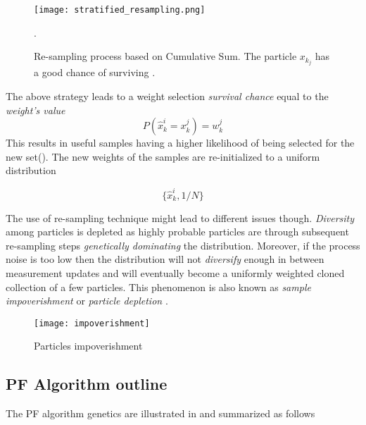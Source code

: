 \begin{figure}[H]
	\centering
	\texttt{[image: stratified\_resampling.png]}
	\caption{Re-sampling process based on Cumulative Sum. The particle $x_{k_j}$ has a good chance of surviving \cite{Chatzi2002}.}.
	\label{fig:CSW}
\end{figure}


The above strategy leads to a weight selection \emph{survival chance} equal to the \emph{weight's value}
$$P(\hat{x}_k^i = x_k^j) = w_k^j$$ This results in useful samples having a higher likelihood of being selected for the new set(). The new weights of the samples are re-initialized to a uniform distribution

\begin{equation}\label{eq:normalize2CSW}
	\{\hat{x}_k^i , 1/N\}
\end{equation}



The use of re-sampling technique might lead to different issues though. \emph{Diversity} among particles is depleted as highly probable particles are through subsequent re-sampling steps \emph{genetically dominating} the distribution. Moreover, if the process noise is too low then the distribution will not \emph{diversify} enough in between measurement updates and will eventually become a uniformly weighted cloned collection of a few particles. This phenomenon is also known as \emph{sample impoverishment} or \emph{particle depletion}  \cite{Chatzi2002}.

\begin{figure}[H]
	\centering
	\texttt{[image: impoverishment]}
	\caption{Particles impoverishment \cite{Ju2019}}
	\label{fig:impoverishment}
\end{figure}


\subsection{PF Algorithm outline}


The PF algorithm genetics are illustrated in  and summarized as follows

